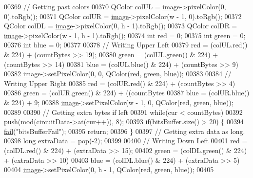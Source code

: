 \begin{DoxyCode}
00369         \textcolor{comment}{// Getting past colors}
00370         QColor colUL = \mbox{\hyperlink{namespacetests-setup_ad55b685280f549e15688a94cbb89f512}{image}}->pixelColor(0, 0).toRgb();
00371         QColor colUR = \mbox{\hyperlink{namespacetests-setup_ad55b685280f549e15688a94cbb89f512}{image}}->pixelColor(w - 1, 0).toRgb();
00372         QColor colDL = \mbox{\hyperlink{namespacetests-setup_ad55b685280f549e15688a94cbb89f512}{image}}->pixelColor(0, h - 1).toRgb();
00373         QColor colDR = \mbox{\hyperlink{namespacetests-setup_ad55b685280f549e15688a94cbb89f512}{image}}->pixelColor(w - 1, h - 1).toRgb();
00374         \textcolor{keywordtype}{int} red = 0;
00375         \textcolor{keywordtype}{int} green = 0;
00376         \textcolor{keywordtype}{int} blue = 0;
00377 
00378         \textcolor{comment}{// Writing Upper Left}
00379         red = (colUL.red() & 224) + (countBytes >> 19);
00380         green = (colUL.green() & 224) + (countBytes >> 14) %
00381         blue = (colUL.blue() & 224) + (countBytes >> 9) %
00382         \mbox{\hyperlink{namespacetests-setup_ad55b685280f549e15688a94cbb89f512}{image}}->setPixelColor(0, 0, QColor(red, green, blue));
00383 
00384         \textcolor{comment}{// Writing Upper Right}
00385         red = (colUR.red() & 224) + (countBytes >> 4) %
00386         green = (colUR.green() & 224) + ((countBytes %
00387         blue = (colUR.blue() & 224) + 9;
00388         \mbox{\hyperlink{namespacetests-setup_ad55b685280f549e15688a94cbb89f512}{image}}->setPixelColor(w - 1, 0, QColor(red, green, blue));
00389 
00390         \textcolor{comment}{// Getting extra bytes if left}
00391         \textcolor{keywordflow}{while}(cur < countBytes)
00392             push(mod(circuitData->at(cur++)), 8);
00393         \textcolor{keywordflow}{if}(bitsBuffer.size() > 20) \{
00394             \mbox{\hyperlink{class_model_p_c_a47464b59b7e37fcee25e55475708aabd}{fail}}(\textcolor{stringliteral}{"bitsBufferFail"});
00395             \textcolor{keywordflow}{return};
00396         \}
00397         \textcolor{comment}{// Getting extra data as long.}
00398         \textcolor{keywordtype}{long} extraData = pop(-2);
00399 
00400         \textcolor{comment}{// Writing Down Left}
00401         red = (colDL.red() & 224) + (extraData >> 15);
00402         green = (colDL.green() & 224) + (extraData >> 10) %
00403         blue = (colDL.blue() & 224) + (extraData >> 5) %
00404         \mbox{\hyperlink{namespacetests-setup_ad55b685280f549e15688a94cbb89f512}{image}}->setPixelColor(0, h - 1, QColor(red, green, blue));
00405 

\end{DoxyCode}
